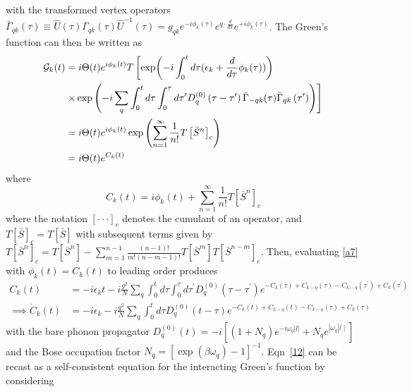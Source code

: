 with the transformed vertex operators $\bar{\Gamma}_{q k}(\tau)\equiv  \hat{U}(\tau)\Gamma_{q k}(\tau)\hat{U}^{-1}(\tau)=g_{q k} e^{-i \phi_k(\tau)} e^{q \cdot \frac{d}{d k}} e^{+i \phi_k(\tau)}$. The Green's function can then be written as
\begin{align}
    \mathcal{G}_k(t)&=i\Theta(t) e^{i \phi_k(t)} T \left[\exp (-i \int_0^t d \tau(\epsilon_k+\frac{d}{d \tau} \phi_k(\tau)))\right. \\
& \left.\times \exp \left(-i \sum_q \int_0^t d \tau \int_0^\tau d \tau^{\prime} D_q^{(0)}\left(\tau-\tau^{\prime}\right) \bar{\Gamma}_{-q k}(\tau) \bar{\Gamma}_{q k}\left(\tau^{\prime}\right)\right)\right] \notag \\
&=i\Theta(t) e^{i \phi_k(t)} \exp\left(\sum_{n=1}^{\infty} \frac{1}{n!} T\left[\bar{S}^n\right]_c\right) \\
&=i\Theta(t) e^{C_k(t)}
\end{align}
where
\begin{equation}
    C_k(t)=i\phi_k(t) + \sum_{n=1}^{\infty} \frac{1}{n!} T\left[\bar{S}^n\right]_c
\label{a7}
\end{equation}
where the notation $[\cdot \cdot \cdot]_c$ denotes the cumulant of an operator, and $T[\bar{S}]_c=T[\bar{S}]$ with subsequent terms given by $T\left[\bar{S}^n\right]_c=T\left[\bar{S}^n\right]-\sum_{m=1}^{n-1} \frac{(n-1)!}{m!(n-m-1)!} T\left[\bar{S}^m\right] T\left[\bar{S}^{n-m}\right]_c$. Then, evaluating \ref{a7} with $\phi_k(t)=C_k(t)$ to leading order produces
\begin{align}
    C_k(t)&=-i \epsilon_k t - i \frac{g^2}{N}\sum_q \int_0^t d \tau \int_0^\tau d \tau^{\prime} D_q^{(0)}\left(\tau-\tau^{\prime}\right) e^{-C_k(\tau)+C_{k-q}(\tau)-C_{k-q}\left(\tau^{\prime}\right)+C_k\left(\tau^{\prime}\right)} \label{12} \\
\implies \dot{C}_k(t)&=-i \epsilon_k - i \frac{g^2}{N} \sum_q \int_0^t d \tau D_q^{(0)}(t-\tau) e^{-C_k(t)+C_{k-q}(t)-C_{k-q}(\tau)+C_k(\tau)} \label{13}
\end{align}
with the bare phonon propagator $D_q^{(0)}(t)= -i\left[\left(1+N_q\right) e^{-i \omega_q|l|}+N_q e^{\left|\omega_q\right| l \mid}\right]$ and the Bose occupation factor $N_q=\left[\exp \left(\beta \omega_q\right)-1\right]^{-1}$.  Eqn~\ref{12} can be recast as a self-consistent equation for the interacting Green's function by considering
